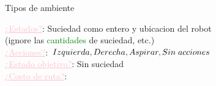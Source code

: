 
    \begin{frame}{Tipos de ambiente}
        \small{
            \textcolor{Pink}{\underline{¿Estados?}}: Suciedad como entero y ubicacion del robot \\          \hspace{1.8cm} (ignore las \textcolor{Green}{cantidades} de suciedad, etc.) \\
            \textcolor{Pink}{\underline{¿Acciones?}}: \textcolor{Purple}{$Izquierda, Derecha, Aspirar, %
            Sin \hspace{0.1cm}acciones$} \\
            \textcolor{Pink}{\underline{¿Estado objetivo?}}: Sin suciedad \\
            \textcolor{Pink}{\underline{¿Costo de ruta?}}: 
        }
        \break\break\break\break\break
    \end{frame}
